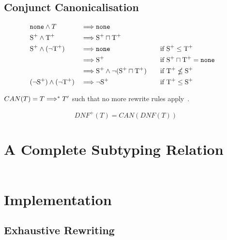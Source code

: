 \documentclass[nonacm,timestamp,manuscript]{acmart}
\newcommand{\atom}[1]{\texttt{#1}}
\newcommand{\type}{\text{T}}
\newcommand{\types}{\text{S}}
\newcommand{\postype}{{\type}^{+}}
\newcommand{\postypes}{{\types}^{+}}
\begin{document}
\subsection{Conjunct Canonicalisation}

\begin{definition}\label{def:can}
  \begin{alignat}{3}
    & \atom{none} \land T && \rewrite \atom{none} \\
    & \postypes \land \postype && \rewrite \postypes \sqcap \postype \\
    & \postypes \land (\neg \postype) && \rewrite \atom{none} && \quad \text{if}\ \postypes \le \postype \\
    &                              && \rewrite \postypes && \quad \text{if}\ \postypes \sqcap \postype = \atom{none} \\
    &                              && \rewrite \postypes \land \neg (\postypes \sqcap \postype) && \quad \text{if}\ \postype \nleq \postypes \\
    & (\neg \postypes) \land (\neg \postype) && \rewrite \neg \postypes && \quad \text{if}\ \postype \le \postypes
\end{alignat}

$CAN(T) = T \Longrightarrow^{*} T^{\prime}$ such that no more rewrite rules
apply~\cite{Pearce2013}.
\end{definition}

\begin{definition}
\begin{align*}
  {DNF}^{+}(T) = CAN(DNF(T))
\end{align*}
\end{definition}

\section{A Complete Subtyping Relation}

\begin{align*}
\end{align*}

\section{Implementation}

\subsection{Exhaustive Rewriting}
  
\end{document}
